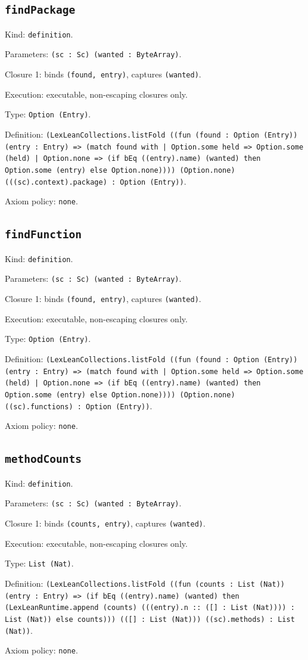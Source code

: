 \documentclass[11pt]{article}
\begin{document}
\subsection*{\texttt{findPackage}}
\noindent Kind: \texttt{definition}.\par
\noindent Parameters: \texttt{(sc : Sc) (wanted : ByteArray)}.\par
\noindent Closure 1: binds \texttt{(found, entry)}, captures \texttt{(wanted)}.\par
\noindent Execution: executable, non-escaping closures only.\par
\noindent Type: \texttt{Option (Entry)}.\par
\noindent Definition: \texttt{(LexLeanCollections.listFold ((fun (found : Option (Entry)) (entry : Entry) => (match found with | Option.some held => Option.some (held) | Option.none => (if bEq ((entry).name) (wanted) then Option.some (entry) else Option.none)))) (Option.none) (((sc).context).package) : Option (Entry))}.\par
\noindent Axiom policy: \texttt{none}.\par
\subsection*{\texttt{findFunction}}
\noindent Kind: \texttt{definition}.\par
\noindent Parameters: \texttt{(sc : Sc) (wanted : ByteArray)}.\par
\noindent Closure 1: binds \texttt{(found, entry)}, captures \texttt{(wanted)}.\par
\noindent Execution: executable, non-escaping closures only.\par
\noindent Type: \texttt{Option (Entry)}.\par
\noindent Definition: \texttt{(LexLeanCollections.listFold ((fun (found : Option (Entry)) (entry : Entry) => (match found with | Option.some held => Option.some (held) | Option.none => (if bEq ((entry).name) (wanted) then Option.some (entry) else Option.none)))) (Option.none) ((sc).functions) : Option (Entry))}.\par
\noindent Axiom policy: \texttt{none}.\par
\subsection*{\texttt{methodCounts}}
\noindent Kind: \texttt{definition}.\par
\noindent Parameters: \texttt{(sc : Sc) (wanted : ByteArray)}.\par
\noindent Closure 1: binds \texttt{(counts, entry)}, captures \texttt{(wanted)}.\par
\noindent Execution: executable, non-escaping closures only.\par
\noindent Type: \texttt{List (Nat)}.\par
\noindent Definition: \texttt{(LexLeanCollections.listFold ((fun (counts : List (Nat)) (entry : Entry) => (if bEq ((entry).name) (wanted) then (LexLeanRuntime.append (counts) (((entry).n :: ([] : List (Nat)))) : List (Nat)) else counts))) (([] : List (Nat))) ((sc).methods) : List (Nat))}.\par
\noindent Axiom policy: \texttt{none}.\par
\end{document}
